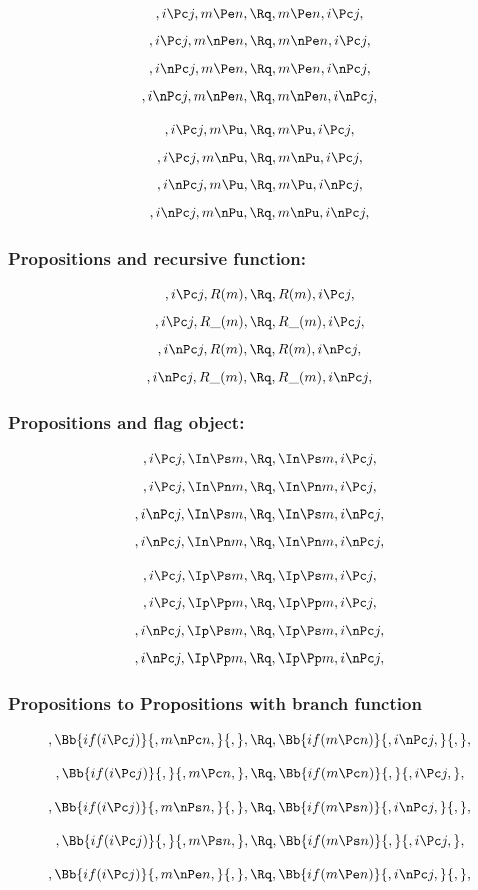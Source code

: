 \[,i \Pc j, m \Pe n, \Rq , m \Pe n, i \Pc j,\]
\[,i \Pc j, m \nPe n, \Rq , m \nPe n, i \Pc j,\]
\[,i \nPc j, m \Pe n, \Rq , m \Pe n, i \nPc j,\]
\[,i \nPc j, m \nPe n, \Rq , m \nPe n, i \nPc j,\]

\[,i \Pc j, m \Pu, \Rq , m \Pu, i \Pc j,\]
\[,i \Pc j, m \nPu, \Rq , m \nPu, i \Pc j,\]
\[,i \nPc j, m \Pu, \Rq , m \Pu, i \nPc j,\]
\[,i \nPc j, m \nPu, \Rq , m \nPu, i \nPc j,\]



\bigskip
\bigskip
\bigskip
\bigskip
\subsubsection{ Propositions and recursive function:}
\[,i \Pc j, R(m), \Rq , R(m), i \Pc j,\]
\[,i \Pc j, R\_(m), \Rq , R\_(m), i \Pc j,\]
\[,i \nPc j,R(m), \Rq , R(m), i \nPc j,\]
\[,i \nPc j, R\_(m), \Rq , R\_(m), i \nPc j,\]



\bigskip
\bigskip
\bigskip
\bigskip
\subsubsection{ Propositions and flag object:}
\[,i \Pc j, \In \Ps m, \Rq , \In \Ps m, i \Pc j,\]
\[,i \Pc j, \In \Pn m, \Rq , \In \Pn m, i \Pc j,\]
\[,i \nPc j,\In \Ps m, \Rq , \In \Ps m, i \nPc j,\]
\[,i \nPc j, \In \Pn m, \Rq , \In \Pn m, i \nPc j,\]

\[,i \Pc j, \Ip \Ps m, \Rq , \Ip \Ps m, i \Pc j,\]
\[,i \Pc j, \Ip \Pp m, \Rq , \Ip \Pp m, i \Pc j,\]
\[,i \nPc j,\Ip \Ps m, \Rq , \Ip \Ps m, i \nPc j,\]
\[,i \nPc j, \Ip \Pp m, \Rq , \Ip \Pp m, i \nPc j,\]



\bigskip
\bigskip
\bigskip
\bigskip
\subsubsection{ Propositions to Propositions with branch function}
\[, \Bb{if(i \Pc j)}{,m \nPc n,}{,}, \Rq , \Bb{if(m \Pc n)}{,i \nPc j,}{,},\]

\bigskip
\bigskip
\[, \Bb{if(i \Pc j)}{,}{,m \Pc n,}, \Rq , \Bb{if(m \Pc n)}{,}{,i \Pc j,},\]


\bigskip
\bigskip
\[, \Bb{if(i \Pc j)}{,m \nPs n,}{,}, \Rq , \Bb{if(m \Ps n)}{,i \nPc j,}{,},\]

\bigskip
\bigskip
\[, \Bb{if(i \Pc j)}{,}{,m \Ps n,}, \Rq , \Bb{if(m \Ps n)}{,}{,i \Pc j,},\]

\bigskip
\bigskip
\[, \Bb{if(i \Pc j)}{,m \nPe n,}{,}, \Rq , \Bb{if(m \Pe n)}{,i \nPc j,}{,},\]

